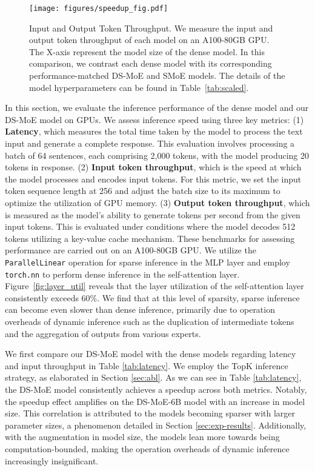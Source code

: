 \begin{figure}[h]
\centering
\texttt{[image: figures/speedup\_fig.pdf]}
\caption{Input and Output Token Throughput. We measure the input and output token throughput of each model on an A100-80GB GPU. The X-axis represent the model size of the dense model. In this comparison, we contrast each dense model with its corresponding performance-matched DS-MoE and SMoE models. The details of the model hyperparameters can be found in Table~\ref{tab:scaled}.}
\label{fig:speedup}
\end{figure}In this section, we evaluate the inference performance of the dense model and our DS-MoE model on GPUs. We assess inference speed using three key metrics: (1) \textbf{Latency}, which measures the total time taken by the model to process the text input and generate a complete response. This evaluation involves processing a batch of 64 sentences, each comprising 2,000 tokens, with the model producing 20 tokens in response. (2) \textbf{Input token throughput}, which is the speed at which the model processes and encodes input tokens. For this metric, we set the input token sequence length at 256 and adjust the batch size to its maximum to optimize the utilization of GPU memory. (3) \textbf{Output token throughput}, which is measured as the model's ability to generate tokens per second from the given input tokens. This is evaluated under conditions where the model decodes 512 tokens utilizing a key-value cache mechanism. These benchmarks for assessing performance are carried out on an A100-80GB GPU. We utilize the \texttt{ParallelLinear} operation \cite{tan2024scattered} for sparse inference in the MLP layer and employ \texttt{torch.nn} \cite{paszke2019pytorch} to perform dense inference in the self-attention layer. Figure~\ref{fig:layer_util} reveals that the layer utilization of the self-attention layer consistently exceeds 60\%. We find that at this level of sparsity, sparse inference can become even slower than dense inference, primarily due to operation overheads of dynamic inference such as the duplication of intermediate tokens and the aggregation of outputs from various experts.

We first compare our DS-MoE model with the dense models regarding latency and input throughput in Table \ref{tab:latency}. We employ the TopK inference strategy, as elaborated in Section \ref{sec:abl}. As we can see in Table \ref{tab:latency}, the DS-MoE model consistently achieves a speedup across both metrics. Notably, the speedup effect amplifies on the DS-MoE-6B model with an increase in model size. This correlation is attributed to the models becoming sparser with larger parameter sizes, a phenomenon detailed in Section \ref{sec:exp-results}. Additionally, with the augmentation in model size, the models lean more towards being computation-bounded, making the operation overheads of dynamic inference increasingly insignificant. 

